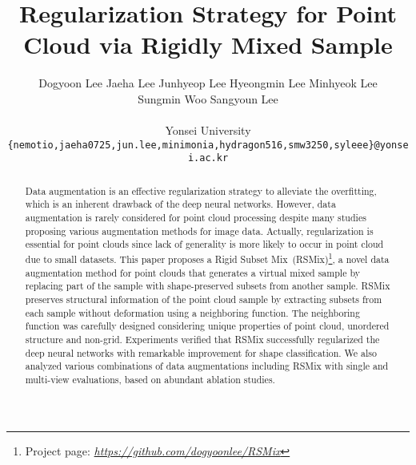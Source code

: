 \documentclass[final]{cvpr}
\begin{document}
\title{Regularization Strategy for Point Cloud via Rigidly Mixed Sample}









\author{Dogyoon Lee \quad
       Jaeha Lee \quad
       Junhyeop Lee \quad
       Hyeongmin Lee \quad
       Minhyeok Lee \\
       Sungmin Woo \quad
       Sangyoun Lee \\ 
\vspace{0.01cm}\\
       Yonsei University \\
       {\tt\small \{nemotio,jaeha0725,jun.lee,minimonia,hydragon516,smw3250,syleee\}@yonsei.ac.kr}
}

\maketitle
\begin{abstract}
Data augmentation is an effective regularization strategy to alleviate the overfitting, which is an inherent drawback of the deep neural networks. However, data augmentation is rarely considered for point cloud processing despite many studies proposing various augmentation methods for image data. Actually, regularization is essential for point clouds since lack of generality is more likely to occur in point cloud due to small datasets. This paper proposes a Rigid Subset Mix~(RSMix)\footnote{Project page: \textit{\url{https://github.com/dogyoonlee/RSMix}}}, a novel data augmentation method for point clouds that generates a virtual mixed sample by replacing part of the sample with shape-preserved subsets from another sample. RSMix preserves structural information of the point cloud sample by extracting subsets from each sample without deformation using a neighboring function. The neighboring function was carefully designed considering unique properties of point cloud, unordered structure and non-grid. Experiments verified that RSMix successfully regularized the deep neural networks with remarkable improvement for shape classification. We also analyzed various combinations of data augmentations including RSMix with single and multi-view evaluations, based on abundant ablation studies.
\end{abstract}
\vspace{-0.3cm}
\end{document}
